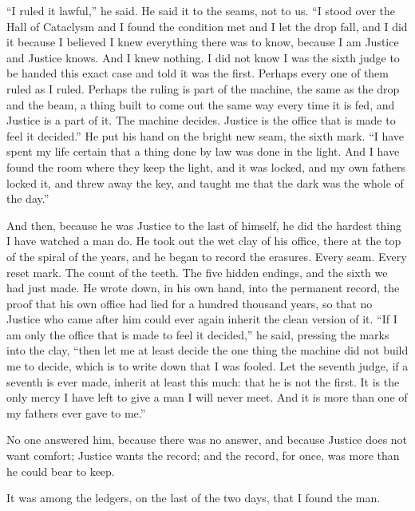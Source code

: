 ``I ruled it lawful,'' he said. He said it to the seams, not to us. ``I stood over the Hall of Cataclysm and I found the condition met and I let the drop fall, and I did it because I believed I knew everything there was to know, because I am Justice and Justice knows. And I knew nothing. I did not know I was the sixth judge to be handed this exact case and told it was the first. Perhaps every one of them ruled as I ruled. Perhaps the ruling is part of the machine, the same as the drop and the beam, a thing built to come out the same way every time it is fed, and Justice is a part of it. The machine decides. Justice is the office that is made to feel it decided.'' He put his hand on the bright new seam, the sixth mark. ``I have spent my life certain that a thing done by law was done in the light. And I have found the room where they keep the light, and it was locked, and my own fathers locked it, and threw away the key, and taught me that the dark was the whole of the day.''\par

And then, because he was Justice to the last of himself, he did the hardest thing I have watched a man do. He took out the wet clay of his office, there at the top of the spiral of the years, and he began to record the erasures. Every seam. Every reset mark. The count of the teeth. The five hidden endings, and the sixth we had just made. He wrote down, in his own hand, into the permanent record, the proof that his own office had lied for a hundred thousand years, so that no Justice who came after him could ever again inherit the clean version of it. ``If I am only the office that is made to feel it decided,'' he said, pressing the marks into the clay, ``then let me at least decide the one thing the machine did not build me to decide, which is to write down that I was fooled. Let the seventh judge, if a seventh is ever made, inherit at least this much: that he is not the first. It is the only mercy I have left to give a man I will never meet. And it is more than one of my fathers ever gave to me.''\par

No one answered him, because there was no answer, and because Justice does not want comfort; Justice wants the record; and the record, for once, was more than he could bear to keep.\par

\ornament

It was among the ledgers, on the last of the two days, that I found the man.\par

